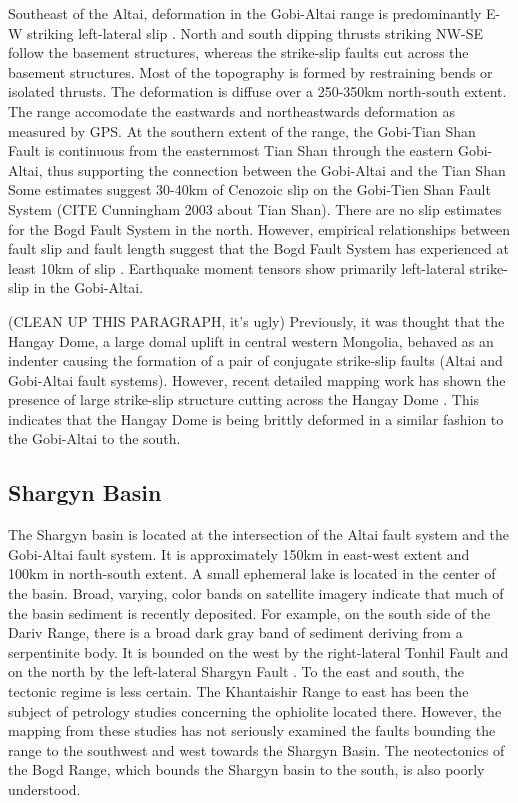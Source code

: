 \documentclass[10pt,a4paper]{article}
\begin{document}
Southeast of the Altai, deformation in the Gobi-Altai range is predominantly E-W striking left-lateral slip \citep{Cunningham2010}. North and south dipping thrusts striking NW-SE follow the basement structures, whereas the strike-slip faults cut across the basement structures. Most of the topography is formed by restraining bends or isolated thrusts. The deformation is diffuse over a 250-350km north-south extent. The range accomodate the eastwards and northeastwards deformation as measured by GPS. At the southern extent of the range, the Gobi-Tian Shan Fault is continuous from the easternmost Tian Shan through the eastern Gobi-Altai, thus supporting the connection between the Gobi-Altai and the Tian Shan Some estimates suggest 30-40km of Cenozoic slip on the Gobi-Tien Shan Fault System (CITE Cunningham 2003 about Tian Shan). There are no slip estimates for the Bogd Fault System in the north. However, empirical relationships between fault slip and fault length suggest that the Bogd Fault System has experienced at least 10km of slip \citep{Cowie1992}.  Earthquake moment tensors show primarily left-lateral strike-slip in the Gobi-Altai. 

(CLEAN UP THIS PARAGRAPH, it's ugly) Previously, it was thought that the Hangay Dome, a large domal uplift in central western Mongolia, behaved as an indenter causing the formation of a pair of conjugate strike-slip faults (Altai and Gobi-Altai fault systems). However, recent detailed mapping work has shown the presence of large strike-slip structure cutting across the Hangay Dome \citep{Walker2007}. This indicates that the Hangay Dome is being brittly deformed in a similar fashion to the Gobi-Altai to the south.

\subsection{Shargyn Basin}

	The Shargyn basin is located at the intersection of the Altai fault system and the Gobi-Altai fault system. It is approximately 150km in east-west extent and 100km in north-south extent. A small ephemeral lake is located in the center of the basin. Broad, varying, color bands on satellite imagery indicate that much of the basin sediment is recently deposited. For example, on the south side of the Dariv Range, there is a broad dark gray band of sediment deriving from a serpentinite body. It is bounded on the west by the right-lateral Tonhil Fault and on the north by the left-lateral Shargyn Fault \citep{Cunningham2003}. To the east and south, the tectonic regime is less certain. The Khantaishir Range to east has been the subject of petrology studies concerning the ophiolite located there. However, the mapping from these studies has not seriously examined the faults bounding the range to the southwest and west towards the Shargyn Basin.  The neotectonics of the Bogd Range, which bounds the Shargyn basin to the south, is also poorly understood.
\end{document}
